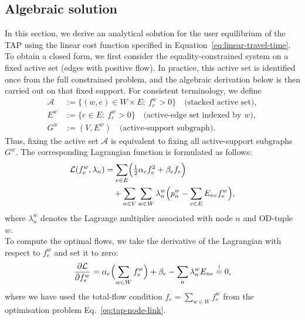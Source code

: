 \documentclass[twocolumn,english,groupedaddress, superscriptaddress,aps,pre,10pt,floatfix]{revtex4-2}
\begin{document}
\subsection{Algebraic solution}\label{sec:tap-solution}
In this section, we derive an analytical solution for the user equilibrium of the TAP using the linear cost function specified in Equation~\ref{eq:linear-travel-time}.
To obtain a closed form, we first consider the equality-constrained system on a fixed active set (edges with positive flow). In practice, this active set is identified once from the full constrained problem, and the algebraic derivation below is then carried out on that fixed support.
For consistent terminology, we define
\begin{align}
\mathcal{A} &:= \{(w,e)\in W\times E:\ f_e^w>0\}
\quad\text{(stacked active set)},\\
E^w &:= \{e\in E:\ f_e^w>0\}
\quad\text{(active-edge set indexed by }w\text{)},\\
G^w &:= (V,E^w)
\quad\text{(active-support subgraph)}.
\end{align}
Thus, fixing the active set $\mathcal{A}$ is equivalent to fixing all active-support subgraphs $G^w$.
The corresponding Lagrangian function is formulated as follows:
\begin{align}\label{eq:lagrangian-deriv}
    \mathcal{L}(f_e^w, \lambda_n) &= \sum_{e \in E} \Bigl(\tfrac12\alpha_e f_e^{2}
    + \beta_e f_e\Bigr) \nonumber \\
    &\quad + \sum_{n \in V}\sum_{w \in W}\lambda_n^{w}
    \Bigl(p_n^{w} - \sum_{e \in E}E_{ne}f_e^{w}\Bigr),
\end{align}
where $\lambda_n^{w}$ denotes the Lagrange multiplier associated with node $n$ and OD‑tuple $w$.\\

To compute the optimal flows, we take the derivative of the Lagrangian with respect to $f_e^{w}$ and set it to zero:
\begin{align}\label{eq:deriv-lagrangian-zero}
\frac{\partial\mathcal{L}}{\partial f_e^{w}}
    = \alpha_e\Bigl(\sum_{w\in W}f_e^{w}\Bigr) + \beta_e
      - \sum_{n}\lambda_n^{w}E_{ne}
    \stackrel{!}{=}0,
\end{align}
where we have used the total‑flow condition $f_e=\sum_{w\in W}f_e^{w}$ from the optimisation problem Eq.~\ref{eq:tap-node-link}.\\
\end{document}
